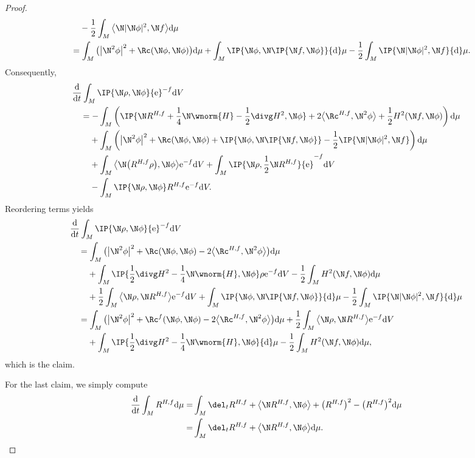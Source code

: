 \begin{proof}
\begin{align*}
 &\quad \phantom{={}}{} -\frac12\int_M \big\langle\N|\N\phi|^2,\N f\big\rangle {\rm d}\mu\\
	&\quad=\int_M \big(\big|\N^2\phi\big|^2+\Rc(\N\phi,\N\phi)\big) {\rm d}\mu +\int_M \IP{\N \phi,\N\IP{\N f,\N\phi}} {\rm d}\mu-\frac12\int_M \IP{\N|\N\phi|^2,\N f} {\rm d}\mu.
	\end{align*}
Consequently,
	\begin{align*}
	&\frac{{\rm d}}{{\rm d}t}\int_M \IP{\N\rho,\N\phi}{\rm e}^{-f} {\rm d}V\\
	&\quad=-\int_M \left(\IP{\N R^{H,f}+\frac1{4}\N\wnorm{H}-\frac12\divg H^2,\N\phi}+2\big\langle\Rc^{H,f},\N^2\phi\big\rangle+\frac12H^2(\N f,\N\phi) \right) {\rm d}\mu\\
	& \phantom{\quad={}}{} +\int_M \left(\big|\N^2\phi\big|^2+\Rc(\N\phi,\N\phi) + \IP{\N \phi,\N\IP{\N f,\N\phi}} -\frac12 \IP{\N|\N\phi|^2,\N f} \right) {\rm d}\mu\\
	& \phantom{\quad={}}{} +\int_M \big\langle\N\big(R^{H,f}\rho\big),\N \phi\big\rangle{\rm e}^{-f} {\rm d}V +\int_M \IP{\N\rho,\frac12\N R^{H,f}}{\rm e}^{-f} {\rm d}V \\
&\phantom{\quad={}}{}-\int_M \IP{\N\rho,\N\phi} R^{H,f} {\rm e}^{-f} {\rm d}V.
	\end{align*}
 Reordering terms yields
	\begin{align*}
	&\frac{{\rm d}}{{\rm d}t} \int_M \IP{\N\rho,\N\phi}{\rm e}^{-f} {\rm d}V\\
	&\quad=\int_M \big(\big|\N^2\phi\big|^2+\Rc(\N\phi,\N\phi)-2\big\langle\Rc^{H,f},\N^2\phi\big\rangle \big) {\rm d}\mu\\
	&\phantom{\quad={}}{}+\int_M \IP{\frac12\divg H^2-\frac1{4}\N\wnorm{H},\N \phi}\rho {\rm e}^{-f} {\rm d}V -\frac12\int_M H^2(\N f,\N\phi) {\rm d}\mu\\
 &\phantom{\quad={}}{}+\frac12\int_M \big\langle\N\rho,\N R^{H,f}\big\rangle{\rm e}^{-f} {\rm d}V
	+\int_M \IP{\N \phi,\N\IP{\N f,\N\phi}} {\rm d}\mu-\frac12\int_M \IP{\N|\N\phi|^2,\N f} {\rm d}\mu\\
	&\quad=\int_M \big(\big|\N^2\phi\big|^2+\Rc^f(\N\phi,\N\phi)-2\big\langle\Rc^{H,f},\N^2\phi\big\rangle\big) {\rm d}\mu +\frac12\int_M \big\langle\N\rho,\N R^{H,f}\big\rangle{\rm e}^{-f} {\rm d}V\\
 &\phantom{\quad={}}{}+\int_M \IP{\frac12\divg H^2-\frac1{4}\N\wnorm{H},\N \phi} {\rm d}\mu
	-\frac12\int_M H^2(\N f,\N\phi) {\rm d}\mu,
	\end{align*}
	which is the claim.
	
	For the last claim, we simply compute
	\begin{align*}
	\frac{{\rm d}}{{\rm d}t}\int_M R^{H,f} {\rm d}\mu=&\int_M \del_t R^{H,f}+\big\langle\N R^{H,f},\N\phi\big\rangle+\big(R^{H,f}\big)^2-\big(R^{H,f}\big)^2 {\rm d}\mu\\
	=&\int_M \del_t R^{H,f}+\big\langle\N R^{H,f},\N\phi\big\rangle {\rm d}\mu.\tag*{\qed}
	\end{align*} \renewcommand{\qed}{}
\end{proof}


